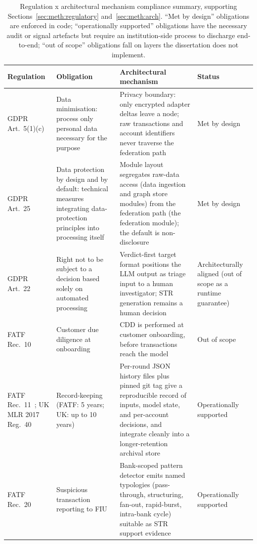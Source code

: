 \documentclass{report}
\begin{document}
\begin{table}[H]
\centering
\caption[Regulation x architectural mechanism compliance]{Regulation x architectural mechanism compliance summary, supporting Sections~\ref{sec:meth:regulatory} and~\ref{sec:meth:arch}. ``Met by design'' obligations are enforced in code; ``operationally supported'' obligations have the necessary audit or signal artefacts but require an institution-side process to discharge end-to-end; ``out of scope'' obligations fall on layers the dissertation does not implement.}
\label{tab:regulatory-compliance}
\small
\begin{tabularx}{\textwidth}{p{3.2cm} p{4.0cm} X p{2.4cm}}
\toprule
\textbf{Regulation} & \textbf{Obligation} & \textbf{Architectural mechanism} & \textbf{Status} \\
\midrule
GDPR Art.~5(1)(c)~\cite{gdpr2016} & Data minimisation: process only personal data necessary for the purpose & Privacy boundary: only encrypted adapter deltas leave a node; raw transactions and account identifiers never traverse the federation path & Met by design \\
\addlinespace
GDPR Art.~25~\cite{gdpr2016} & Data protection by design and by default: technical measures integrating data-protection principles into processing itself & Module layout segregates raw-data access (data ingestion and graph store modules) from the federation path (the federation module); the default is non-disclosure & Met by design \\
\addlinespace
GDPR Art.~22~\cite{gdpr2016} & Right not to be subject to a decision based solely on automated processing & Verdict-first target format positions the LLM output as triage input to a human investigator; STR generation remains a human decision & Architecturally aligned (out of scope as a runtime guarantee) \\
\addlinespace
FATF Rec.~10~\cite{fatf2025recommendations} & Customer due diligence at onboarding & CDD is performed at customer onboarding, before transactions reach the model & Out of scope \\
\addlinespace
FATF Rec.~11~\cite{fatf2025recommendations}; UK MLR 2017 Reg.~40~\cite{ukmlr2017} & Record-keeping (FATF: 5 years; UK: up to 10 years) & Per-round JSON history files plus pinned git tag give a reproducible record of inputs, model state, and per-account decisions, and integrate cleanly into a longer-retention archival store & Operationally supported \\
\addlinespace
FATF Rec.~20~\cite{fatf2025recommendations} & Suspicious transaction reporting to FIU & Bank-scoped pattern detector emits named typologies (pass-through, structuring, fan-out, rapid-burst, intra-bank cycle) suitable as STR support evidence & Operationally supported \\

\end{tabularx}
\end{table}
\end{document}
